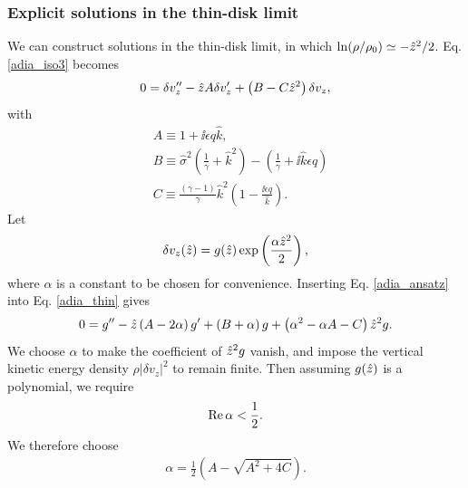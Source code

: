 \subsubsection{Explicit solutions in the thin-disk limit}\label{adia_explicit}
We can construct solutions in the thin-disk limit, in which 
$\ln(\rho/\rho_0) \simeq -\hat{z}^2/2$. Eq. \ref{adia_iso3} becomes   
\begin{align}
  0 = \delta v_z^{\prime\prime} - \hat{z} A \delta v_z^\prime + \left(B
    - C \hat{z}^2\right)\delta v_z, \label{adia_iso4} 
\end{align}
with
\begin{align}
  &A \equiv 1 + \ii \epsilon q \hat{k},\\
  &B \equiv \hat{\sigma}^2\left(\frac{1}{\gamma} + \hat{k}^2\right) -
  \left(\frac{1}{\gamma} + \ii \hat{k} \epsilon q\right)\\
  &C \equiv \frac{\left(\gamma-1\right)}{\gamma}\hat{k}^2\left(1 - \frac{\ii
      \epsilon q}{\hat{k}}\right).\label{adia_thin}
\end{align}
Let
\begin{align}
  \delta v_z(\hat{z}) =
  g(\hat{z})\exp\left(\frac{\alpha\hat{z}^2}{2}\right), \label{adia_ansatz}
\end{align}
where $\alpha$ is a constant to be chosen for convenience. Inserting
Eq. \ref{adia_ansatz} into Eq. \ref{adia_thin} gives
\begin{align}
  0 = g^{\prime\prime} - \hat{z}\left(A - 2\alpha\right)g^\prime + \left(B +
    \alpha\right)g
  +\left(\alpha^2 - \alpha A - C\right)\hat{z}^2 g.
\end{align}
We choose $\alpha$ to make the coefficient of $\hat{z}^2g$
vanish, and impose the vertical kinetic energy density
$\rho|\delta v_z|^2$ to remain finite. Then assuming $g(\hat{z})$ is a
polynomial, we require  
\begin{align}
  \operatorname{Re}\alpha < \frac{1}{2}. 
\end{align}
We therefore choose 
\begin{align}
  \alpha = \frac{1}{2}\left(A - \sqrt{A^2 + 4C}\right). 
\end{align} 


